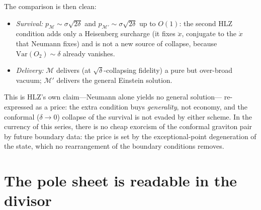 \documentclass[11pt]{article}
\theoremstyle{definition}
\theoremstyle{remark}
\begin{document}
The comparison is then clean:
\begin{itemize}
\item \emph{Survival:} $p_{\mathcal{M}}\sim\sigma\sqrt{2\delta}$ and
$p_{\mathcal{M}'}\sim\sigma\sqrt{2\delta}$ up to $O(1)$: the second HLZ
condition adds only a Heisenberg surcharge (it fixes $\ddot x$,
conjugate to the $\dot x$ that Neumann fixes) and is not a new source
of collapse, because $\mathrm{Var}(O_{2})\sim\delta$ already
vanishes.
\item \emph{Delivery:} $\mathcal{M}$ delivers (at $\sqrt{\delta}$-collapsing
fidelity) a pure but over-broad vacuum; $\mathcal{M}'$ delivers the general
Einstein solution.
\end{itemize}
This is HLZ's own claim---Neumann alone yields no general solution---%
re-expressed as a price: the extra condition buys \emph{generality},
not economy, and the conformal ($\delta\to0$) collapse of the
survival is not evaded by either scheme. In the currency of this
series, there is no cheap exorcism of the conformal graviton pair by
future boundary data: the price is set by the exceptional-point
degeneration of the state, which no rearrangement of the boundary
conditions removes.

\section{The pole sheet is readable in the divisor}
\label{sec:sheet}
\end{document}
